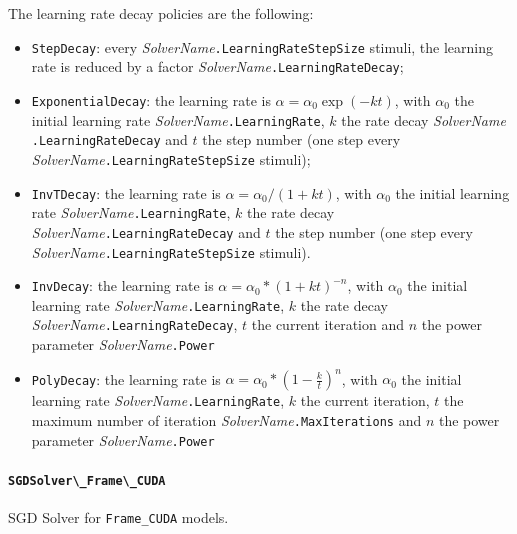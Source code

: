 \documentclass[a4paper,11pt,oneside]{article}
\newenvironment{myitemize}
{ \begin{itemize}
    \setlength{\itemsep}{0pt}
    \setlength{\parskip}{0pt}
    \setlength{\parsep}{0pt}     }
{ \end{itemize}                  }
\begin{document}
The learning rate decay policies are the following:

\begin{myitemize}
\item \lstinline!StepDecay!: every
\emph{SolverName}\lstinline!.LearningRateStepSize! stimuli, the learning rate
is reduced by a factor \emph{SolverName}\lstinline!.LearningRateDecay!; \\
\item \lstinline!ExponentialDecay!: the learning rate is
$\alpha = \alpha_{0}\exp(-k t)$, with $\alpha_{0}$ the initial learning rate
\emph{SolverName}\lstinline!.LearningRate!, $k$ the rate decay \emph{SolverName}
\lstinline!.LearningRateDecay! and $t$ the step number (one step every
 \emph{SolverName}\lstinline!.LearningRateStepSize! stimuli); \\
\item \lstinline!InvTDecay!: the learning rate is
$\alpha = \alpha_{0} / (1 + k t)$, with $\alpha_{0}$ the initial learning rate
 \emph{SolverName}\lstinline!.LearningRate!, $k$ the rate decay
 \emph{SolverName}\lstinline!.LearningRateDecay! and $t$ the step number
 (one step every \emph{SolverName}\lstinline!.LearningRateStepSize! stimuli). \\
 \item \lstinline!InvDecay!: the learning rate is
$\alpha = \alpha_{0} * (1 + k t)^{-n}$, with $\alpha_{0}$ the initial
learning rate \emph{SolverName}\lstinline!.LearningRate!, $k$ the rate decay
\emph{SolverName}\lstinline!.LearningRateDecay!,
$t$ the current iteration and $n$ the power parameter
\emph{SolverName}\lstinline!.Power! \\
\item \lstinline!PolyDecay!: the learning rate is
$\alpha = \alpha_{0} * (1 - \frac{k}{t})^n$, with $\alpha_{0}$ the initial
learning rate \emph{SolverName}\lstinline!.LearningRate!, $k$ the current
iteration, $t$ the maximum number of iteration
\emph{SolverName}\lstinline!.MaxIterations! and $n$ the power parameter
\emph{SolverName}\lstinline!.Power! \\
\end{myitemize}


\paragraph{\texorpdfstring{%
\lstinline[basicstyle=\ttfamily\bfseries]!SGDSolver\_Frame\_CUDA!}
{SGDSolver\_Frame\_CUDA}}
SGD Solver for \lstinline!Frame_CUDA! models.
\end{document}
